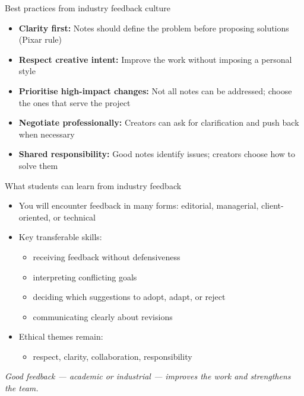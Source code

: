 \documentclass[aspectratio=169]{beamer}
\begin{document}
\begin{frame}{Best practices from industry feedback culture}
\begin{itemize}
  \item \textbf{Clarity first:} Notes should define the problem before proposing solutions (Pixar rule)
  \item \textbf{Respect creative intent:} Improve the work without imposing a personal style
  \item \textbf{Prioritise high-impact changes:} Not all notes can be addressed; choose the ones that serve the project
  \item \textbf{Negotiate professionally:} Creators can ask for clarification and push back when necessary
  \item \textbf{Shared responsibility:} Good notes identify issues; creators choose how to solve them
\end{itemize}

\end{frame}

\begin{frame}{What students can learn from industry feedback}
\begin{itemize}
  \item You will encounter feedback in many forms: editorial, managerial, client-oriented, or technical
  \item Key transferable skills:
    \begin{itemize}
      \item receiving feedback without defensiveness
      \item interpreting conflicting goals
      \item deciding which suggestions to adopt, adapt, or reject
      \item communicating clearly about revisions
    \end{itemize}
  \item Ethical themes remain:
    \begin{itemize}
      \item respect, clarity, collaboration, responsibility
    \end{itemize}
\end{itemize}
\textit{Good feedback — academic or industrial — improves the work and strengthens the team.}
\end{frame}


\end{document}
